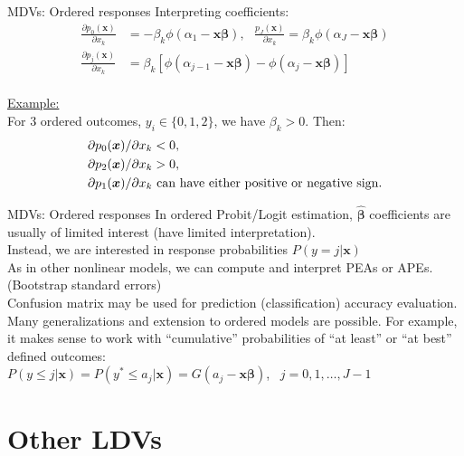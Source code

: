 \documentclass[usenames,dvipsnames]{beamer}
\begin{document}
\begin{frame}{MDVs: Ordered responses}
Interpreting coefficients: 
\begin{align*}
\frac{\partial p_0(\bm{x})}{\partial x_k} & = -\beta_k \phi(\alpha_1 - \bm{x \beta}), ~~~ \frac{p_J(\bm{x})}{\partial x_k} = \beta_k \phi (\alpha_J - \bm{x \beta}) \\
\frac{\partial p_j(\bm{x})}{\partial x_k} & = \beta_k[\phi(\alpha_{j-1} - \bm{x \beta}) - \phi(\alpha_j - \bm{x \beta})]
\end{align*} \\
\medskip
\underline{Example:}\\
\medskip
For 3 ordered outcomes, $y_i \in \{0,1,2\}$, we have $\beta_k >0$. Then:
\begin{align*}
\partial p_0(\bm{x}) & / \partial x_k < 0, \\
\partial p_2(\bm{x}) & / \partial x_k > 0, \\
\partial p_1(\bm{x}) & / \partial x_k \ \textnormal{can have either positive or negative sign.}
\end{align*} 
\end{frame}
\begin{frame}{MDVs: Ordered responses}
In ordered Probit/Logit estimation, $\hat{\bm{\beta}}$ coefficients are usually of limited interest (have limited interpretation). \\
\medskip
Instead, we are interested in response probabilities $P(y=j|\bm{x})$ \\
\medskip
As in other nonlinear models, we can compute and interpret PEAs or APEs. (Bootstrap standard errors) \\
\medskip
Confusion matrix may be used for prediction (classification) accuracy evaluation. \\
\medskip
Many generalizations and extension to ordered models are possible. For example, it makes sense to work with ``cumulative'' probabilities of ``at least'' or ``at best'' defined outcomes: \\
\medskip
$P(y \le j|\bm{x}) = P(y^{\ast} \le a_j|\bm{x}) = G(a_j - \bm{x \beta})$, \ $j = 0,1, \dots, J-1$
\end{frame}
\section{Other LDVs}
\end{document}
